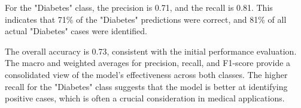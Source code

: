 For the "Diabetes" class, the precision is 0.71, and the recall is 0.81. This indicates that 71\% of the "Diabetes" predictions were correct, and 81\% of all actual "Diabetes" cases were identified.

The overall accuracy is 0.73, consistent with the initial performance evaluation. The macro and weighted averages for precision, recall, and F1-score provide a consolidated view of the model's effectiveness across both classes. The higher recall for the "Diabetes" class suggests that the model is better at identifying positive cases, which is often a crucial consideration in medical applications.